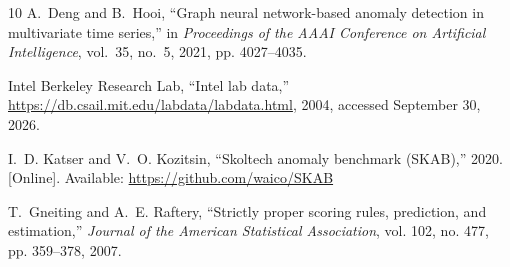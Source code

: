 \documentclass[conference]{IEEEtran}
\newcommand{\1}{\mathbf{1}}
\begin{document}
\begin{thebibliography}{10}
A.~Deng and B.~Hooi, ``Graph neural network-based anomaly detection in
  multivariate time series,'' in \emph{Proceedings of the AAAI Conference on
  Artificial Intelligence}, vol.~35, no.~5, 2021, pp. 4027--4035.

{Intel Berkeley Research Lab}, ``Intel lab data,''
  \url{https://db.csail.mit.edu/labdata/labdata.html}, 2004, accessed September
  30, 2026.

\BIBentryALTinterwordspacing
I.~D. Katser and V.~O. Kozitsin, ``Skoltech anomaly benchmark ({SKAB}),'' 2020.
  [Online]. Available: \url{https://github.com/waico/SKAB}
\BIBentrySTDinterwordspacing

T.~Gneiting and A.~E. Raftery, ``Strictly proper scoring rules, prediction, and
  estimation,'' \emph{Journal of the American Statistical Association}, vol.
  102, no. 477, pp. 359--378, 2007.

\end{thebibliography}
\end{document}
